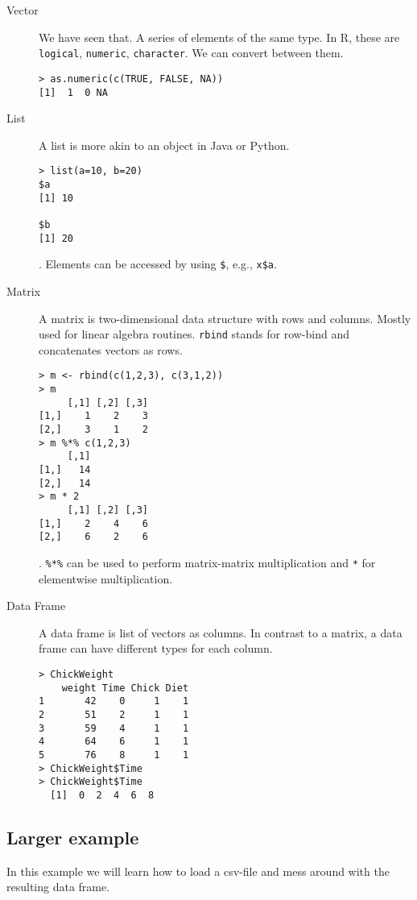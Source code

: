 \documentclass{article}[11pt]
\begin{document}
\begin{description}
\item[Vector] We have seen that. A series of elements of the same
  type. In R, these are \texttt{logical}, \texttt{numeric},
  \texttt{character}. We can convert between them.

\begin{verbatim}
> as.numeric(c(TRUE, FALSE, NA))
[1]  1  0 NA
\end{verbatim}
\item[List] A list is more akin to an object in Java or Python.

\begin{verbatim}
> list(a=10, b=20)
$a
[1] 10

$b
[1] 20
\end{verbatim}. Elements can be accessed by using \texttt{\$}, e.g., \texttt{x\$a}.
\item[Matrix] A matrix is two-dimensional data structure with rows and
  columns. Mostly used for linear algebra routines. \texttt{rbind}
  stands for row-bind and concatenates vectors as rows.

\begin{verbatim}
> m <- rbind(c(1,2,3), c(3,1,2))
> m
     [,1] [,2] [,3]
[1,]    1    2    3
[2,]    3    1    2
> m %*% c(1,2,3)
     [,1]
[1,]   14
[2,]   14
> m * 2
     [,1] [,2] [,3]
[1,]    2    4    6
[2,]    6    2    6
\end{verbatim}. \texttt{\%*\%} can be used to perform matrix-matrix multiplication and \texttt{*} for elementwise multiplication.
\item[Data Frame] A data frame is list of vectors as columns. In contrast to a matrix, a data frame can have different types for each column.

\begin{verbatim}
> ChickWeight
    weight Time Chick Diet
1       42    0     1    1
2       51    2     1    1
3       59    4     1    1
4       64    6     1    1
5       76    8     1    1
> ChickWeight$Time
> ChickWeight$Time
  [1]  0  2  4  6  8
\end{verbatim}
\end{description}

\subsection*{Larger example}

In this example we will learn how to load a csv-file and mess around
with the resulting data frame.
\end{document}
